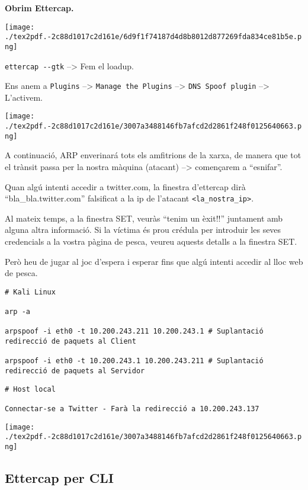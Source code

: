\documentclass[]{article}
\begin{document}
\textbf{Obrim Ettercap.}

\texttt{[image: ./tex2pdf.-2c88d1017c2d161e/6d9f1f74187d4d8b8012d877269fda834ce81b5e.png]}

\texttt{ettercap\ -\/-gtk} --\textgreater{} Fem el loadup.

Ens anem a \texttt{Plugins} --\textgreater{}
\texttt{Manage\ the\ Plugins} --\textgreater{}
\texttt{DNS\ Spoof\ plugin} --\textgreater{} L'activem.

\texttt{[image: ./tex2pdf.-2c88d1017c2d161e/3007a3488146fb7afcd2d2861f248f0125640663.png]}

A continuació, ARP enverinará tots els amfitrions de la xarxa, de manera
que tot el trànsit passa per la nostra màquina (atacant)
--\textgreater{} començarem a ``esnifar''.

Quan algú intenti accedir a twitter.com, la finestra d'ettercap dirà
``bla\_bla.twitter.com'' falsificat a la ip de l'atacant
\texttt{\textless{}la\_nostra\_ip\textgreater{}}.

Al mateix temps, a la finestra SET, veuràs ``tenim un èxit!!'' juntament
amb alguna altra informació. Si la víctima és prou crédula per introduir
les seves credencials a la vostra pàgina de pesca, veureu aquests
detalls a la finestra SET.

Però heu de jugar al joc d'espera i esperar fins que algú intenti
accedir al lloc web de pesca.

\begin{verbatim}
# Kali Linux

arp -a

arpspoof -i eth0 -t 10.200.243.211 10.200.243.1 # Suplantació redirecció de paquets al Client

arpspoof -i eth0 -t 10.200.243.1 10.200.243.211 # Suplantació redirecció de paquets al Servidor
\end{verbatim}

\begin{verbatim}
# Host local

Connectar-se a Twitter - Farà la redirecció a 10.200.243.137

\end{verbatim}

\texttt{[image: ./tex2pdf.-2c88d1017c2d161e/3007a3488146fb7afcd2d2861f248f0125640663.png]}

\hypertarget{ettercap-per-cli}{%
\subsection{\texorpdfstring{\textbf{Ettercap per
CLI}}{Ettercap per CLI}}\label{ettercap-per-cli}}
\end{document}
